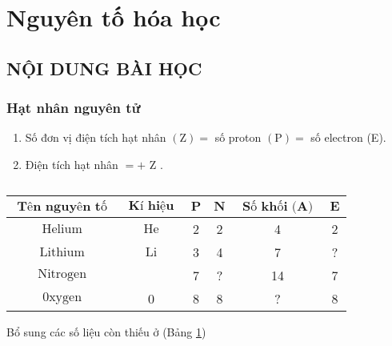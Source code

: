 \newpage
\section{Nguyên tố hóa học}
\subsection{NỘI DUNG BÀI HỌC}
\subsubsection{Hạt nhân nguyên tử}
\begin{hoplythuyet}
	\begin{enumerate}
		\item Số đơn vị điện tích hạt nhân $(\mathrm{Z})=$ số proton $(\mathrm{P})=$ số electron (E).
		\item Điện tích hạt nhân $=+$ Z .
	\end{enumerate}
\end{hoplythuyet}

\begin{longtable}{|c|c|c|c|c|c|}
	\caption{}
	\label{tab:table2}\\
	\hline 
	\rowcolor{\mauphu!25}$ \textbf { Tên nguyên tố } $ & $ \textbf { Kí hiệu } $ & $ \textbf{P} $ & $ \textbf{N} $ & $ \textbf { Số khối  (A) } $ & $ \textbf{E} $\\
	\hline 
	$ \text { Helium } $ & $ \text { He } $ & 2 & 2 & 4 & 2 \\
	\hline 
	$ \text { Lithium } $ & $ \text { Li } $ & 3 & 4 & 7 & ? \\
	\hline 
	$ \text { Nitrogen } $ & \text { N } & 7 & ? & 14 & 7 \\
	\hline
	$ \text { 0xygen }$ & 0 & 8 & 8 & ? & 8 \\
	\hline
\end{longtable}
\begin{hoivadap}
	Bổ sung các số liệu còn thiếu ở (Bảng \ref{tab:table2})
\end{hoivadap}
